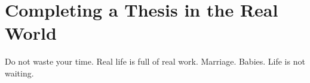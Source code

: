 \chapter{Completing a Thesis in the Real World}
\label{get_it_done}

Do not waste your time.
Real life is full of real work. Marriage. Babies.
Life is not waiting.

